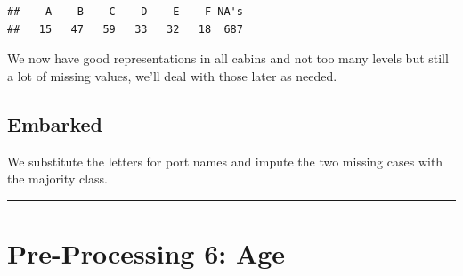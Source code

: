\documentclass[]{article}
\newenvironment{Shaded}{\begin{snugshade}}{\end{snugshade}}
\newcommand{\KeywordTok}[1]{\textcolor[rgb]{0.13,0.29,0.53}{\textbf{#1}}}
\newcommand{\StringTok}[1]{\textcolor[rgb]{0.31,0.60,0.02}{#1}}
\newcommand{\CommentTok}[1]{\textcolor[rgb]{0.56,0.35,0.01}{\textit{#1}}}
\newcommand{\OperatorTok}[1]{\textcolor[rgb]{0.81,0.36,0.00}{\textbf{#1}}}
\newcommand{\NormalTok}[1]{#1}
\begin{document}
\begin{Shaded}
\end{Shaded}

\begin{verbatim}
##    A    B    C    D    E    F NA's 
##   15   47   59   33   32   18  687
\end{verbatim}

We now have good representations in all cabins and not too many levels
but still a lot of missing values, we'll deal with those later as
needed.

\subsection{Embarked}\label{embarked}

We substitute the letters for port names and impute the two missing
cases with the majority class.

\begin{Shaded}
\end{Shaded}

\begin{center}\rule{0.5\linewidth}{\linethickness}\end{center}

\section{Pre-Processing 6: Age}\label{pre-processing-6-age}
\end{document}
